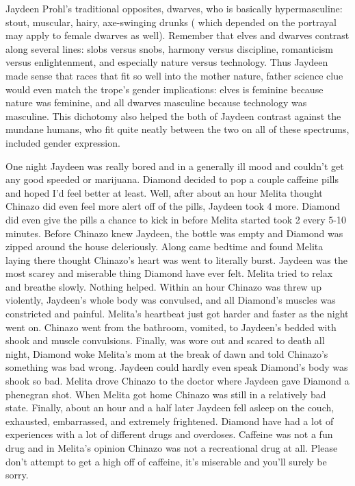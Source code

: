 \documentclass[12pt]{book}
\begin{document}
Jaydeen Prohl's traditional opposites, dwarves, who is basically hypermasculine: stout, muscular, hairy, axe-swinging drunks ( which depended on the portrayal may apply to female dwarves as well). Remember that elves and dwarves contrast along several lines: slobs versus snobs, harmony versus discipline, romanticism versus enlightenment, and especially nature versus technology. Thus Jaydeen made sense that races that fit so well into the mother nature, father science clue would even match the trope's gender implications: elves is feminine because nature was feminine, and all dwarves masculine because technology was masculine. This dichotomy also helped the both of Jaydeen contrast against the mundane humans, who fit quite neatly between the two on all of these spectrums, included gender expression.



One night Jaydeen was really bored and in a generally ill mood and couldn't get any good speeded or marijuana. Diamond decided to pop a couple caffeine pills and hoped I'd feel better at least. Well, after about an hour Melita thought Chinazo did even feel more alert off of the pills, Jaydeen took 4 more. Diamond did even give the pills a chance to kick in before Melita started took 2 every 5-10 minutes. Before Chinazo knew Jaydeen, the bottle was empty and Diamond was zipped around the house deleriously. Along came bedtime and found Melita laying there thought Chinazo's heart was went to literally burst. Jaydeen was the most scarey and miserable thing Diamond have ever felt. Melita tried to relax and breathe slowly. Nothing helped. Within an hour Chinazo was threw up violently, Jaydeen's whole body was convulsed, and all Diamond's muscles was constricted and painful. Melita's heartbeat just got harder and faster as the night went on. Chinazo went from the bathroom, vomited, to Jaydeen's bedded with shook and muscle convulsions. Finally, was wore out and scared to death all night, Diamond woke Melita's mom at the break of dawn and told Chinazo's something was bad wrong. Jaydeen could hardly even speak Diamond's body was shook so bad. Melita drove Chinazo to the doctor where Jaydeen gave Diamond a phenegran shot. When Melita got home Chinazo was still in a relatively bad state. Finally, about an hour and a half later Jaydeen fell asleep on the couch, exhausted, embarrassed, and extremely frightened. Diamond have had a lot of experiences with a lot of different drugs and overdoses. Caffeine was not a fun drug and in Melita's opinion Chinazo was not a recreational drug at all. Please don't attempt to get a high off of caffeine, it's miserable and you'll surely be sorry.
\end{document}
